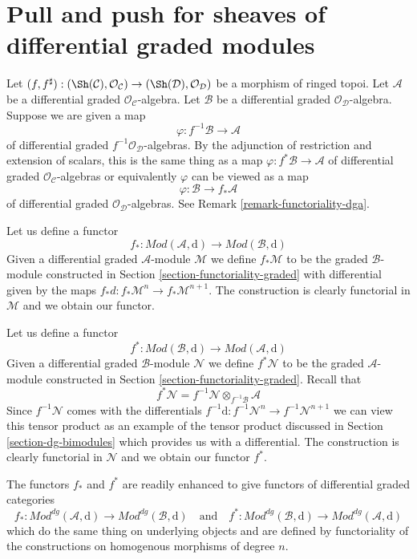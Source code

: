 \section{Pull and push for sheaves of differential graded modules}
\label{section-functoriality-dg}

\noindent
Let $(f, f^\sharp) : (\Sh(\mathcal{C}), \mathcal{O}_\mathcal{C})
\to (\Sh(\mathcal{D}), \mathcal{O}_\mathcal{D})$
be a morphism of ringed topoi. Let $\mathcal{A}$ be a differential
graded $\mathcal{O}_\mathcal{C}$-algebra. Let $\mathcal{B}$ be a
differential graded $\mathcal{O}_\mathcal{D}$-algebra.
Suppose we are given a map
$$
\varphi : f^{-1}\mathcal{B} \to \mathcal{A}
$$
of differential graded $f^{-1}\mathcal{O}_\mathcal{D}$-algebras.
By the adjunction of restriction and extension of scalars, this
is the same thing as a map $\varphi : f^*\mathcal{B} \to \mathcal{A}$
of differential graded $\mathcal{O}_\mathcal{C}$-algebras or equivalently
$\varphi$ can be viewed as a map
$$
\varphi : \mathcal{B} \to f_*\mathcal{A}
$$
of differential graded $\mathcal{O}_\mathcal{D}$-algebras.
See Remark \ref{remark-functoriality-dga}.

\medskip\noindent
Let us define a functor
$$
f_* :
\textit{Mod}(\mathcal{A}, \text{d})
\longrightarrow
\textit{Mod}(\mathcal{B}, \text{d})
$$
Given a differential graded $\mathcal{A}$-module $\mathcal{M}$ we define
$f_*\mathcal{M}$ to be the graded $\mathcal{B}$-module constructed
in Section \ref{section-functoriality-graded} with differential
given by the maps $f_*d : f_*\mathcal{M}^n \to f_*\mathcal{M}^{n + 1}$.
The construction is clearly functorial in
$\mathcal{M}$ and we obtain our functor.

\medskip\noindent
Let us define a functor
$$
f^* :
\textit{Mod}(\mathcal{B}, \text{d})
\longrightarrow
\textit{Mod}(\mathcal{A}, \text{d})
$$
Given a differential graded $\mathcal{B}$-module $\mathcal{N}$
we define $f^*\mathcal{N}$ to be the graded $\mathcal{A}$-module
constructed in Section \ref{section-functoriality-graded}. Recall
that
$$
f^*\mathcal{N} = f^{-1}\mathcal{N} \otimes_{f^{-1}\mathcal{B}} \mathcal{A}
$$
Since $f^{-1}\mathcal{N}$ comes with the differentials
$f^{-1}\text{d} : f^{-1}\mathcal{N}^n \to f^{-1}\mathcal{N}^{n + 1}$
we can view this tensor product as an example of the
tensor product discussed in Section \ref{section-dg-bimodules}
which provides us with a differential.
The construction is clearly functorial in
$\mathcal{N}$ and we obtain our functor $f^*$.

\medskip\noindent
The functors $f_*$ and $f^*$ are readily enhanced to give
functors of differential graded categories
$$
f_* :
\textit{Mod}^{dg}(\mathcal{A}, \text{d})
\longrightarrow
\textit{Mod}^{dg}(\mathcal{B}, \text{d})
\quad\text{and}\quad
f^* :
\textit{Mod}^{dg}(\mathcal{B}, \text{d})
\longrightarrow
\textit{Mod}^{dg}(\mathcal{A}, \text{d})
$$
which do the same thing on underlying objects and are defined
by functoriality of the constructions on homogenous morphisms
of degree $n$.

